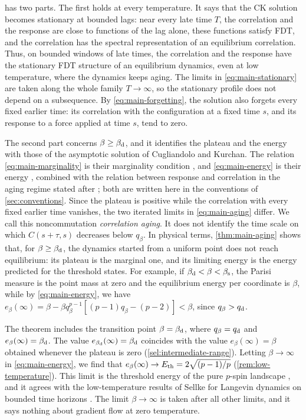  has two parts. The first holds at every temperature. It says that the CK solution becomes stationary at bounded lags: near every late time $T$, the correlation and the response are close to functions of the lag alone, these functions satisfy FDT, and the correlation has the spectral representation of an equilibrium correlation. Thus, on bounded windows of late times, the correlation and the response have the stationary FDT structure of an equilibrium dynamics, even at low temperature, where the dynamics keeps aging. The limits in \eqref{eq:main-stationary} are taken along the whole family $T\to\infty$, so the stationary profile does not depend on a subsequence. By \eqref{eq:main-forgetting}, the solution also forgets every fixed earlier time: its correlation with the configuration at a fixed time $s$, and its response to a force applied at time $s$, tend to zero.

The second part concerns $\beta\ge\beta_{\mathrm d}$, and it identifies the plateau and the energy with those of the asymptotic solution of Cugliandolo and Kurchan. The relation \eqref{eq:main-marginality} is their marginality condition \cite[Equation~(7)]{ck1993}, and \eqref{eq:main-energy} is their energy \cite[Equation~(9)]{ck1993}, combined with the relation between response and correlation in the aging regime stated after \cite[Equation~(12)]{ck1993}; both are written here in the conventions of \cref{sec:conventions}. Since the plateau is positive while the correlation with every fixed earlier time vanishes, the two iterated limits in \eqref{eq:main-aging} differ. We call this noncommutation \emph{correlation aging}. It does not identify the time scale on which $C(s+\tau,s)$ decreases below $q_\beta$. In physical terms, \cref{thm:main-aging} shows that, for $\beta\ge\beta_{\mathrm d}$, the dynamics started from a uniform point does not reach equilibrium: its plateau is the marginal one, and its limiting energy is the energy predicted for the threshold states. For example, if $\beta_{\mathrm d}<\beta<\beta_{\mathrm s}$, the Parisi measure is the point mass at zero and the equilibrium energy per coordinate is $\beta$, while by \eqref{eq:main-energy}, we have $e_\beta(\infty)=\beta-\beta q_\beta^{p-1}[(p-1)q_\beta-(p-2)]<\beta$, since $q_\beta>q_{\mathrm d}$.

The theorem includes the transition point $\beta=\beta_{\mathrm d}$, where $q_\beta=q_{\mathrm d}$ and $e_\beta(\infty)=\beta_{\mathrm d}$. The value $e_{\beta_{\mathrm d}}(\infty)=\beta_{\mathrm d}$ coincides with the value $e_\beta(\infty)=\beta$ obtained whenever the plateau is zero (\cref{sel:intermediate-range}). Letting $\beta\to\infty$ in \eqref{eq:main-energy}, we find that $e_\beta(\infty)\to E_{\mathrm{th}}=2\sqrt{(p-1)/p}$ (\cref{rem:low-temperature}). This limit is the threshold energy of the pure $p$-spin landscape \cite[Equation~(2.13)]{abc2013}, and it agrees with the low-temperature results of Sellke for Langevin dynamics on bounded time horizons \cite[Theorems~1.1 and~1.7]{sellke2024}. The limit $\beta\to\infty$ is taken after all other limits, and it says nothing about gradient flow at zero temperature.

